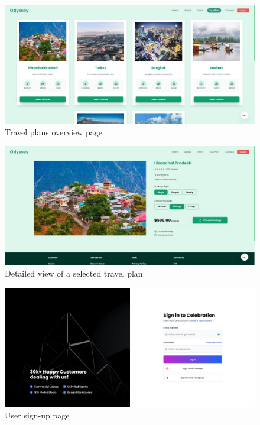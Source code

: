 \documentclass{scrreprt}
\begin{document}
\begin{figure}[h!]
    \centering
    \includegraphics[width=1.1\textwidth, height=0.35\textheight]{./SS/plans.jpg}
    \caption{Travel plans overview page}
    \label{fig:plans}
\end{figure}

\begin{figure}[h!]
    \centering
    \includegraphics[width=1.1\textwidth, height=0.35\textheight]{./SS/plan.jpg}
    \caption{Detailed view of a selected travel plan}
    \label{fig:plan}
\end{figure}

\begin{figure}[h!]
    \centering
    \includegraphics[width=1.1\textwidth, height=0.35\textheight]{./SS/signup.jpg}
    \caption{User sign-up page}
    \label{fig:signup}
\end{figure}
\end{document}
